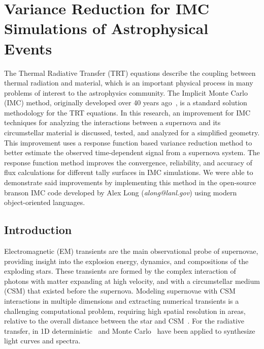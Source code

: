 \chapter{Variance Reduction for IMC Simulations of Astrophysical Events}


\begin{chapabstract}
	The Thermal Radiative Transfer (TRT) equations describe the coupling between thermal radiation and material, which is an important physical process in many problems of interest to the astrophysics community. The Implicit Monte Carlo (IMC) method, originally developed over 40 years ago~\cite{FC71}, is a standard solution methodology for the TRT equations. In this research, an improvement for IMC techniques for analyzing the interactions between a supernova and its circumstellar material is discussed, tested, and analyzed for a simplified geometry. This improvement uses a response function based variance reduction method to better estimate the observed time-dependent signal from a supernova system. The response function method improves the convergence, reliability, and accuracy of flux calculations for different tally surfaces in IMC simulations. We were able to demonstrate said improvements by implementing this method in the open-source branson IMC code developed by Alex Long (\textit{along@lanl.gov}) using modern object-oriented languages.
\end{chapabstract}

\section{Introduction}
Electromagnetic (EM) transients are the main observational probe of supernovae, providing insight into the explosion energy, dynamics, and compositions of the exploding stars. These transients are formed by the complex interaction of photons with matter expanding at high velocity, and with a circumstellar medium (CSM) that existed before the supernova. Modeling supernovae with CSM interactions in multiple dimensions and extracting numerical transients is a challenging computational problem, requiring high spatial resolution in areas, relative to the overall distance between the star and CSM~\cite{MS10,MB13}. For the radiative transfer, in 1D deterministic~\cite{MB13} and Monte Carlo~\cite{KW09} have been applied to synthesize light curves and spectra.

